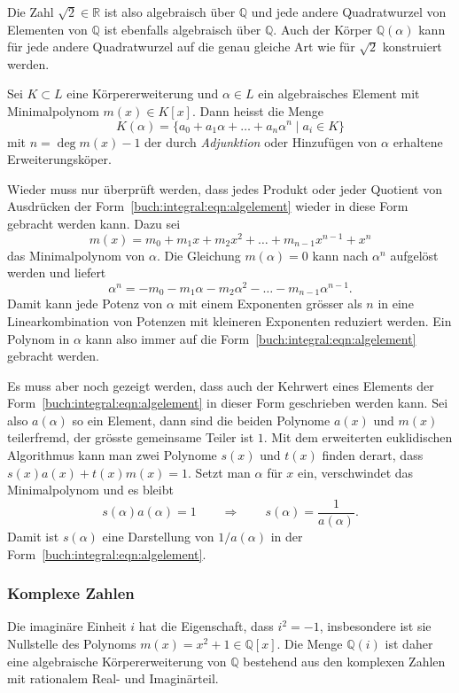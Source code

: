 Die Zahl $\sqrt{2}\in\mathbb{R}$ ist also algebraisch über $\mathbb{Q}$
und jede andere Quadratwurzel von Elementen von $\mathbb{Q}$ ist
ebenfalls algebraisch über $\mathbb{Q}$.
Auch der Körper $\mathbb{Q}(\alpha)$ kann für jede andere Quadratwurzel
auf die genau gleiche Art wie für $\sqrt{2}$ konstruiert werden.

\begin{definition}
\label{buch:integral:definition:algebraischeerweiterung}
Sei $K\subset L$ eine Körpererweiterung und $\alpha\in L$ ein algebraisches
Element mit Minimalpolynom $m(x)\in K[x]$.
Dann heisst die Menge
\begin{equation}
K(\alpha)
=
\{
a_0 + a_1\alpha + \ldots +a_n\alpha^n
\;|\;
a_i\in K
\}
\label{buch:integral:eqn:algelement}
\end{equation}
mit $n=\deg m(x) - 1$ der durch {\em Adjunktion} oder Hinzufügen
von $\alpha$ erhaltene Erweiterungsköper.
%
\end{definition}

Wieder muss nur überprüft werden, dass jedes Produkt oder jeder
Quotient von Ausdrücken der Form~\eqref{buch:integral:eqn:algelement}
wieder in diese Form gebracht werden kann.
Dazu sei
\[
m(x)
=
m_0+m_1x + m_2x^2
+\ldots +m_{n-1}x^{n-1} + x^n
\]
das Minimalpolynom von $\alpha$.
Die Gleichung $m(\alpha)=0$ kann nach $\alpha^n$ aufgelöst werden und
liefert
\[
\alpha^n = -m_0 - m_1\alpha - m_2\alpha^2 -\ldots -m_{n-1}\alpha^{n-1}.
\]
Damit kann jede Potenz von $\alpha$ mit einem Exponenten grösser als $n$
in eine Linearkombination von Potenzen mit kleineren Exponenten
reduziert werden.
Ein Polynom in $\alpha$ kann also immer auf die
Form~\eqref{buch:integral:eqn:algelement}
gebracht werden.

Es muss aber noch gezeigt werden, dass auch der Kehrwert eines Elements
der Form~\eqref{buch:integral:eqn:algelement} in dieser Form geschrieben
werden kann.
Sei also $a(\alpha)$ so ein Element, dann sind die beiden Polynome
$a(x)$ und $m(x)$ teilerfremd, der grösste gemeinsame Teiler ist $1$.
Mit dem erweiterten euklidischen Algorithmus kann man zwei Polynome
$s(x)$ und $t(x)$ finden derart, dass $s(x)a(x)+t(x)m(x)=1$.
Setzt man $\alpha$ für $x$ ein, verschwindet das Minimalpolynom und
es bleibt
\[
s(\alpha)a(\alpha) = 1
\qquad\Rightarrow\qquad
s(\alpha) = \frac{1}{a(\alpha)}.
\]
Damit ist $s(\alpha)$ eine Darstellung von $1/a(\alpha)$ in der 
Form~\eqref{buch:integral:eqn:algelement}.

%
%
\subsubsection{Komplexe Zahlen}
Die imaginäre Einheit $i$ hat die Eigenschaft, dass $i^2=-1$, insbesondere
%
%
%
ist sie Nullstelle des Polynoms $m(x)=x^2+1\in\mathbb{Q}[x]$.
Die Menge $\mathbb{Q}(i)$ ist daher eine algebraische Körpererweiterung
von $\mathbb{Q}$ bestehend aus den komplexen Zahlen mit rationalem
Real- und Imaginärteil.

